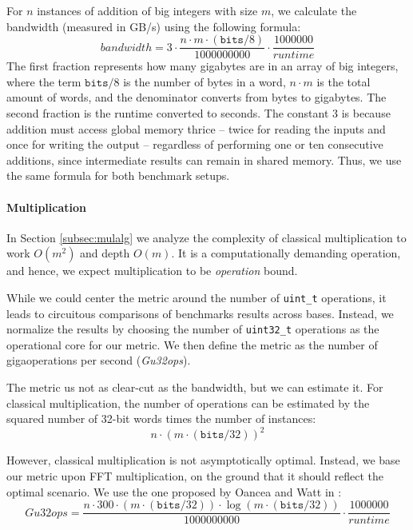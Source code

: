 For $n$ instances of addition of big integers with size $m$, we calculate the
bandwidth (measured in GB/s) using the following formula:
\begin{equation}
    \label{eq:bandwidth}
    \mathit{bandwidth} = 3 \cdot \dfrac{n \cdot m \cdot (\mathtt{bits}/8)}{1000000000} \cdot \dfrac{1000000}{\mathit{runtime}}
\end{equation}
The first fraction represents how many gigabytes are in an array of big
integers, where the term $\mathtt{bits} / 8$ is the number of bytes in a word,
$n\cdot m$ is the total amount of words, and the denominator converts from bytes to
gigabytes. The second fraction is the runtime converted to seconds. The constant
3 is because addition must access global memory thrice -- twice for reading the
inputs and once for writing the output -- regardless of performing one or ten
consecutive additions, since intermediate results can remain in shared
memory. Thus, we use the same formula for both benchmark setups.


\paragraph{Multiplication}
In Section \ref{subsec:mulalg} we analyze the complexity of classical
multiplication to work $O(m^2)$ and depth $O(m)$. It is a computationally
demanding operation, and hence, we expect multiplication to be
\textit{operation} bound.

While we could center the metric around the number of \texttt{uint\_t}
operations, it leads to circuitous comparisons of benchmarks results across
bases. Instead, we normalize the results by choosing the number of
\texttt{uint32\_t} operations as the operational core for our metric. We then
define the metric as the number of gigaoperations per second (\textit{Gu32ops}).

The metric us not as clear-cut as the bandwidth, but we can estimate it. For
classical multiplication, the number of operations can be estimated by the
squared number of 32-bit words times the number of instances:
\begin{equation}
  \label{eq:u32opsobs}
  {n \cdot (m \cdot (\mathtt{bits} / 32))^2}
\end{equation}

However, classical multiplication is not asymptotically optimal. Instead, we
base our metric upon FFT multiplication, on the ground that it should reflect
the optimal scenario. We use the one proposed by Oancea and Watt in
\cite{oancea2024gpu}:
\begin{equation}
  \label{eq:u32ops}
  \mathit{Gu32ops} = \dfrac{n \cdot 300 \cdot (m \cdot (\mathtt{bits} / 32)) \cdot \log (m \cdot (\mathtt{bits} / 32))}{1000000000} \cdot \dfrac{1000000}{\mathit{runtime}}
\end{equation}

